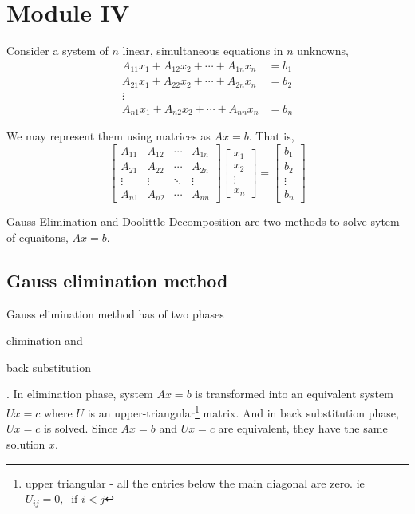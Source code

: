 \chapter{Module IV}

	Consider a system of $n$ linear, simultaneous equations in $n$ unknowns,
	\begin{align*}
		A_{11}x_1 + A_{12}x_2 + \cdots + A_{1n}x_n & = b_1 \\
		A_{21}x_1 + A_{22}x_2 + \cdots + A_{2n}x_n & = b_2 \\
		\vdots \\
		A_{n1}x_1 + A_{n2}x_2 + \cdots + A_{nn}x_n & = b_n 
	\end{align*}

	We may represent them using matrices as $Ax = b$. That is,
	\[ \begin{bmatrix} A_{11} & A_{12} & \cdots & A_{1n} \\ A_{21} & A_{22} & \cdots & A_{2n} \\ \vdots & \vdots & \ddots & \vdots \\ A_{n1} & A_{n2} & \cdots & A_{nn} \end{bmatrix} \begin{bmatrix} x_1 \\ x_2 \\ \vdots \\ x_n \end{bmatrix} = \begin{bmatrix} b_1 \\ b_2 \\ \vdots \\ b_n \end{bmatrix} \]
		
	Gauss Elimination and Doolittle Decomposition are two methods to solve sytem of equaitons, $Ax = b$.

\section{Gauss elimination method}
	Gauss elimination method has of two phases
	\begin{enumerate*}
		\item elimination and
		\item back substitution
	\end{enumerate*}.
	In elimination phase, system $Ax = b$ is transformed into an equivalent system $Ux = c$ where $U$ is an upper-triangular\footnote{upper triangular - all the entries below the main diagonal are zero. ie $U_{ij} = 0,\ \text{ if }i<j$} matrix. And in back substitution phase, $Ux = c$ is solved. Since $Ax = b$ and $Ux =  c$ are equivalent, they have the same solution $x$.

